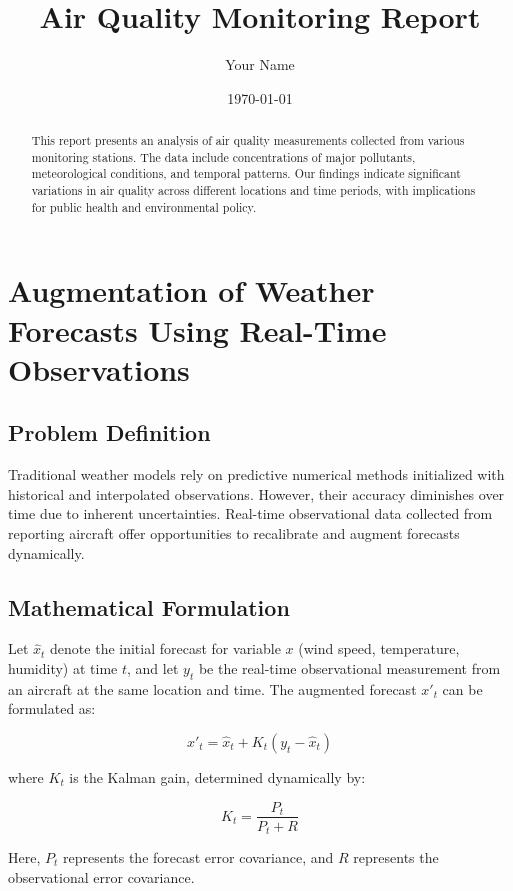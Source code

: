 \documentclass[12pt,a4paper]{article}
\title{Air Quality Monitoring Report}
\author{Your Name}
\date{\today}
\begin{document}
\maketitle

\begin{abstract}
This report presents an analysis of air quality measurements collected from various monitoring stations. The data include concentrations of major pollutants, meteorological conditions, and temporal patterns. Our findings indicate significant variations in air quality across different locations and time periods, with implications for public health and environmental policy.
\end{abstract}

\section{Augmentation of Weather Forecasts Using Real-Time Observations}

\subsection{Problem Definition}
Traditional weather models rely on predictive numerical methods initialized with historical and interpolated observations. However, their accuracy diminishes over time due to inherent uncertainties. Real-time observational data collected from reporting aircraft offer opportunities to recalibrate and augment forecasts dynamically.

\subsection{Mathematical Formulation}
Let $\hat{x}_t$ denote the initial forecast for variable $x$ (wind speed, temperature, humidity) at time $t$, and let $y_t$ be the real-time observational measurement from an aircraft at the same location and time. The augmented forecast $x'_t$ can be formulated as:

\begin{equation}
x'_t = \hat{x}_t + K_t(y_t - \hat{x}_t)
\end{equation}

where $K_t$ is the Kalman gain, determined dynamically by:

\begin{equation}
K_t = \frac{P_t}{P_t + R}
\end{equation}

Here, $P_t$ represents the forecast error covariance, and $R$ represents the observational error covariance.
\end{document}
